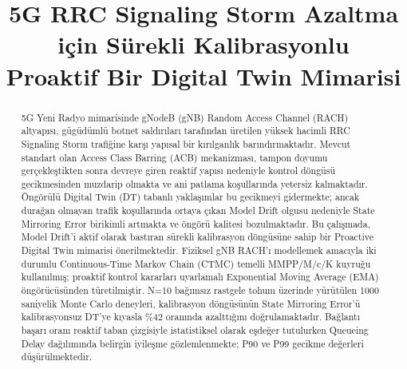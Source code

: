 \documentclass[conference]{IEEEtran}
\begin{document}

\title{5G RRC Signaling Storm Azaltma için Sürekli Kalibrasyonlu\\
       Proaktif Bir Digital Twin Mimarisi}

\author{%
}

\maketitle

\begin{abstract}
5G Yeni Radyo mimarisinde gNodeB (gNB) Random Access Channel (RACH) altyapısı,
gügüdümlü botnet saldırıları tarafından üretilen yüksek hacimli RRC Signaling
Storm trafiğine karşı yapısal bir kırılganlık barındırmaktadır. Mevcut standart
olan Access Class Barring (ACB) mekanizması, tampon doyumu gerçekleştikten sonra
devreye giren reaktif yapısı nedeniyle kontrol döngüsü gecikmesinden muzdarip
olmakta ve ani patlama koşullarında yetersiz kalmaktadır. Öngörülü Digital Twin
(DT) tabanlı yaklaşımlar bu gecikmeyi gidermekte; ancak durağan olmayan trafik
koşullarında ortaya çıkan Model Drift olgusu nedeniyle State Mirroring Error
birikimli artmakta ve öngörü kalitesi bozulmaktadır. Bu çalışmada, Model
Drift'i aktif olarak bastıran sürekli kalibrasyon döngüsüne sahip bir Proactive
Digital Twin mimarisi önerilmektedir. Fiziksel gNB RACH'ı modellemek amacıyla
iki durumlu Continuous-Time Markov Chain (CTMC) temelli MMPP/M/c/K kuyruğu
kullanılmış; proaktif kontrol kararları uyarlamalı Exponential Moving Average
(EMA) öngörücüsünden türetilmiştir. N=10 bağımsız rastgele tohum üzerinde
yürütülen 1000 saniyelik Monte Carlo deneyleri, kalibrasyon döngüsünün State
Mirroring Error'ü kalibrasyonsuz DT'ye kıyasla \%42 oranında azalttığını
doğrulamaktadır. Bağlantı başarı oranı reaktif taban çizgisiyle istatistiksel
olarak eşdeğer tutulurken Queueing Delay dağılımında belirgin iyileşme
gözlemlenmekte; P90 ve P99 gecikme değerleri düşürülmektedir.
\end{abstract}
\end{document}
